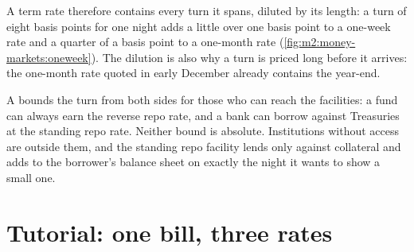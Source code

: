 A term rate therefore contains every turn it spans, diluted by its length:
a turn of eight basis points for one night adds a little over one basis point
to a one-week rate and a quarter of a basis point to a one-month rate
(\cref{fig:m2:money-markets:oneweek}). The dilution is also why a turn is
priced long before it arrives: the one-month rate quoted in early December
already contains the year-end.

\begin{omfigure}

\label{fig:m2:money-markets:oneweek}
\end{omfigure}

\begin{remark}\label{rem:m2:money-markets:ceiling}
A  bounds the turn from both sides for those who can reach the
facilities: a fund can always earn the reverse repo rate, and a bank can
borrow against Treasuries at the standing repo rate. Neither bound is
absolute. Institutions without access are outside them, and the standing repo
facility lends only against collateral and adds to the borrower's balance
sheet on exactly the night it wants to show a small one.
\end{remark}

\section{Tutorial: one bill, three rates}\label{tut:m2:money-markets:bills}

